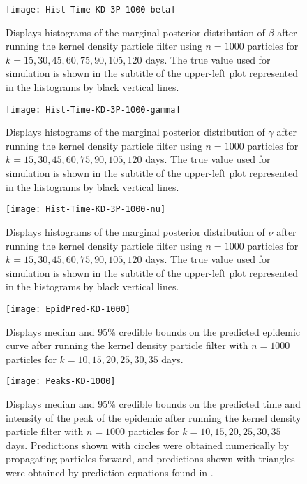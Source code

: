 \documentclass{article}
\begin{document}
\begin{figure}[ht]
\texttt{[image: Hist-Time-KD-3P-1000-beta]}
\caption{Displays histograms of the marginal posterior distribution of $\beta$ after running the kernel density particle filter using $n = 1000$ particles for $k = 15,30,45,60,75,90,105,120$ days.  The true value used for simulation is shown in the subtitle of the upper-left plot represented in the histograms by black vertical lines.} \label{fig:histbeta}
\end{figure}

\begin{figure}[ht]
\texttt{[image: Hist-Time-KD-3P-1000-gamma]}
\caption{Displays histograms of the marginal posterior distribution of $\gamma$ after running the kernel density particle filter using $n = 1000$ particles for $k = 15,30,45,60,75,90,105,120$ days.  The true value used for simulation is shown in the subtitle of the upper-left plot represented in the histograms by black vertical lines.} \label{fig:histgamma}
\end{figure}

\begin{figure}[ht]
\texttt{[image: Hist-Time-KD-3P-1000-nu]}
\caption{Displays histograms of the marginal posterior distribution of $\nu$ after running the kernel density particle filter using $n = 1000$ particles for $k = 15,30,45,60,75,90,105,120$ days.  The true value used for simulation is shown in the subtitle of the upper-left plot represented in the histograms by black vertical lines.} \label{fig:histnu}
\end{figure}

\begin{figure}[ht]
\centering
\texttt{[image: EpidPred-KD-1000]}
\caption{Displays median and 95\% credible bounds on the predicted epidemic curve after running the kernel density particle filter with $n = 1000$ particles for $k = 10,15,20,25,30,35$ days.}
\label{fig:pred}
\end{figure}

\begin{figure}[ht]
\centering
\texttt{[image: Peaks-KD-1000]}
\caption{Displays median and 95\% credible bounds on the predicted time and intensity of the peak of the epidemic after running the kernel density particle filter with $n = 1000$ particles for $k = 10,15,20,25,30,35$ days.  Predictions shown with circles were obtained numerically by propagating particles forward, and predictions shown with triangles were obtained by prediction equations found in \citet{skvortsov2012monitoring}.}
\end{figure}
\end{document}

